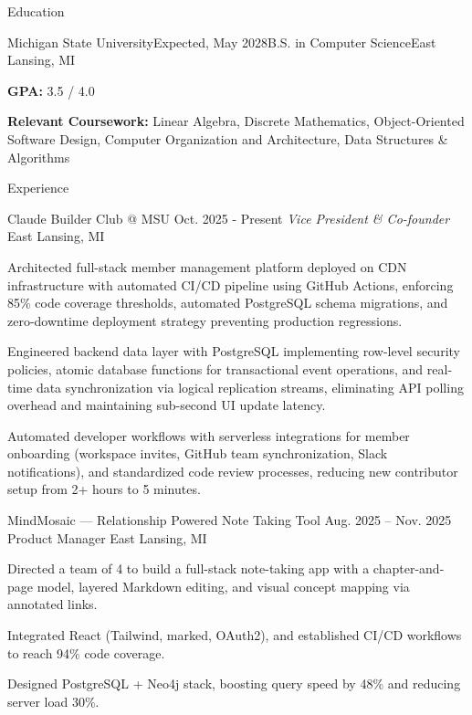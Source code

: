 \documentclass[
	11pt
]{../resume}
\begin{document}
	\begin{rSection}{E}{ducation}
		\begin{rSectionEntry}{Michigan State University}{Expected, May 2028}{B.S. in Computer Science}{}{East Lansing, MI}
			\item \textbf{GPA:} 3.5 / 4.0
			\item \textbf{Relevant Coursework:} Linear Algebra, Discrete Mathematics, Object-Oriented Software Design, Computer Organization and Architecture, Data Structures \& Algorithms
		\end{rSectionEntry}
	\end{rSection}

	\begin{rSection}{E}{xperience}
		\begin{rSectionEntry}
			{Claude Builder Club @ MSU}
			{Oct. 2025 - Present}
			{\textit{Vice President \& Co-founder}}
			{}
			{East Lansing, MI}

			\item Architected full-stack member management platform deployed on CDN infrastructure with automated CI/CD pipeline using GitHub Actions, enforcing 85\% code coverage thresholds, automated PostgreSQL schema migrations, and zero-downtime deployment strategy preventing production regressions.
			\item Engineered backend data layer with PostgreSQL implementing row-level security policies, atomic database functions for transactional event operations, and real-time data synchronization via logical replication streams, eliminating API polling overhead and maintaining sub-second UI update latency.
			\item Automated developer workflows with serverless integrations for member onboarding (workspace invites, GitHub team synchronization, Slack notifications), and standardized code review processes, reducing new contributor setup from 2+ hours to 5 minutes.
		\end{rSectionEntry}

		\begin{rSectionEntry}
			{MindMosaic --- Relationship Powered Note Taking Tool}
			{Aug. 2025 -- Nov. 2025}
			{Product Manager}
			{}
			{East Lansing, MI}

			\item Directed a team of 4 to build a full-stack note-taking app with a chapter-and-page model, layered Markdown editing, and visual concept mapping via annotated links.
			\item Integrated React (Tailwind, marked, OAuth2), and established CI/CD workflows to reach 94\% code coverage.
			\item Designed PostgreSQL + Neo4j stack, boosting query speed by 48\% and reducing server load 30\%.
		\end{rSectionEntry}
	\end{rSection}
\end{document}
